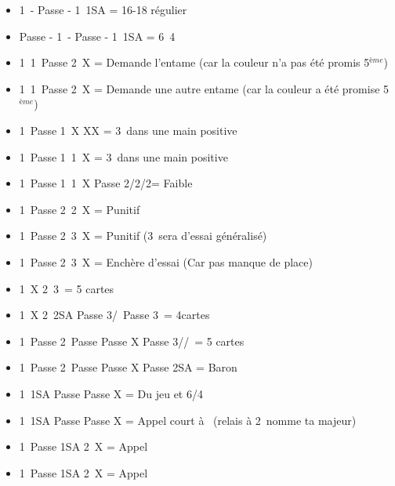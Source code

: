\documentclass[a4paper, oneside, 11pt]{report}
\begin{document}
	\begin{itemize}
	\item 1\trefle\ - Passe - 1\pique\ 1SA = 16-18 régulier
	\item Passe - 1\trefle\ - Passe - 1\pique\ 1SA = 6\carreau\ 4\coeur\\

	\item 1\trefle\ 1\pique\ Passe 2\trefle\ X = Demande l'entame (car la couleur n'a pas été promis 5$^{ème}$)
	\item 1\coeur\ 1\pique\ Passe 2\coeur\ X = Demande une autre entame (car la couleur a été promise 5$^{ème}$)\\

	\item 1\carreau\ Passe 1\coeur\ X XX = 3\coeur\ dans une main positive
	\item 1\carreau\ Passe 1\coeur\ 1\pique\ X = 3\coeur\ dans une main positive
	\item 1\carreau\ Passe 1\coeur\ 1\pique\ X Passe 2\trefle/2\carreau/2\coeur = Faible\\

	\item 1\coeur\ Passe 2\coeur\ 2\pique\ X = Punitif
	\item 1\coeur\ Passe 2\coeur\ 3\trefle\ X = Punitif (3\carreau\ sera d'essai généralisé)
	\item 1\coeur\ Passe 2\coeur\ 3\carreau\ X = Enchère d'essai (Car pas manque de place)\\

	\item 1\pique\ X 2\pique\ 3\coeur\ = 5 cartes
	\item 1\pique\ X 2\pique\ 2SA Passe 3\trefle/\carreau\ Passe 3\coeur\ = 4cartes
	\item 1\pique\ Passe 2\pique\ Passe Passe X Passe 3\trefle/\carreau/\coeur\ = 5 cartes
	\item 1\pique\ Passe 2\pique\ Passe Passe X Passe 2SA = Baron\\

	\item 1\coeur\ 1SA Passe Passe X = Du jeu et 6\coeur/4\pique
	\item 1\trefle\ 1SA Passe Passe X = Appel court à \carreau\ (relais à 2\carreau\ nomme ta majeur)\\

	\item 1\pique\ Passe 1SA 2\carreau\ X = Appel
	\item 1\carreau\ Passe 1SA 2\pique\ X = Appel\\


\end{itemize}
\end{document}
